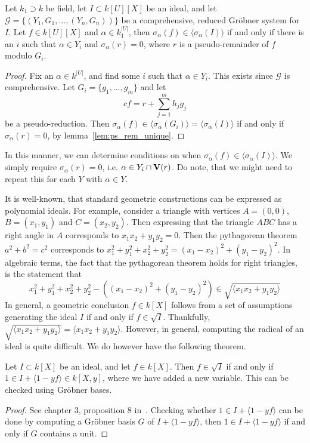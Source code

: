 \begin{theorem}
  Let $k_{1} \supset k$ be field, let $I \subset k[U][X]$ be an ideal, and let $\mathcal G = \{(Y_{1}, G_{1}, \dots, (Y_{n}, G_{n}))\}$ be a comprehensive, reduced Gröbner system for $I$. Let $f \in k[U][X]$ and $\alpha \in k_{1}^{|U|}$, then $\sigma_{\alpha}(f) \in \langle \sigma_{\alpha}(I) \rangle$ if and only if there is an $i$ such that $\alpha \in Y_{i}$ and $\sigma_{\alpha}(r) = 0$, where $r$ is a pseudo-remainder of $f$ modulo $G_{i}$.
\end{theorem}
\begin{proof}
  Fix an $\alpha \in k^{|U|}$, and find some $i$ such that $\alpha \in Y_{i}$. This exists since $\mathcal G$ is comprehensive. Let $G_{i} = \{g_{1}, \dots, g_{m}\}$ and let
  \[c f = r + \sum_{j=1}^{m} h_{j} g_{j}\]
  be a pseudo-reduction. Then $\sigma_{\alpha}(f) \in \langle \sigma_{\alpha}(G_{i}) \rangle = \langle \sigma_{\alpha}(I) \rangle$ if and only if $\sigma_{\alpha}(r) = 0$, by lemma~\ref{lem:ps_rem_unique}.
\end{proof}

In this manner, we can determine conditions on when $\sigma_{\alpha}(f) \in \langle \sigma_{\alpha}(I) \rangle$. We simply require $\sigma_{\alpha}(r) = 0$, i.e. $\alpha \in Y_{i} \cap \operatorname{\mathbf V}(r)$. Do note, that we might need to repeat this for each $Y$ with $\alpha \in Y$.

It is well-known, that standard geometric constructions can be expressed as polynomial ideals. For example, consider a triangle with vertices $A = (0, 0)$, $B = (x_{1}, y_{1})$ and $C = (x_{2}, y_{2})$. Then expressing that the triangle $ABC$ has a right angle in $A$ corresponds to $x_{1} x_{2} + y_{1} y_{2} = 0$. Then the pythagorean theorem $a^{2} + b^{2} = c^{2}$ corresponds to $x_{1}^{2} + y_{1}^{2} + x_{2}^{2} + y_{2}^{2} = (x_{1} - x_{2})^{2} + (y_{1} - y_{2})^{2}$. In algebraic terms, the fact that the pythagorean theorem holds for right triangles, is the statement that
\[x_{1}^{2} + y_{1}^{2} + x_{2}^{2} + y_{2}^{2} - \left((x_{1} - x_{2})^{2} + (y_{1} - y_{2})^{2}\right) \in \sqrt{\langle x_{1} x_{2} + y_{1} y_{2} \rangle} \]
In general, a geometric conclusion $f \in k[X]$ follows from a set of assumptions generating the ideal $I$ if and only if $f \in \sqrt{I}$. Thankfully, $\sqrt{ \langle x_{1} x_{2} + y_{1} y_{2} \rangle } = \langle x_{1} x_{2} + y_{1} y_{2} \rangle$. However, in general, computing the radical of an ideal is quite difficult. We do however have the following theorem.

\begin{theorem}\label{thm:rad}
  Let $I \subset k[X]$ be an ideal, and let $f \in k[X]$. Then $f \in \sqrt{I}$ if and only if $1 \in I + \langle 1 - yf \rangle \in k[X, y]$, where we have added a new variable. This can be checked using Gröbner bases.
\end{theorem}
\begin{proof}
  See chapter 3,  proposition 8 in~\cite{IVA}. Checking whether $1 \in I + \langle 1 - yf \rangle$ can be done by computing a Gröbner basis $G$ of $I + \langle 1 - yf \rangle$, then $1 \in I + \langle 1 - yf \rangle$ if and only if $G$ contains a unit.
\end{proof}

